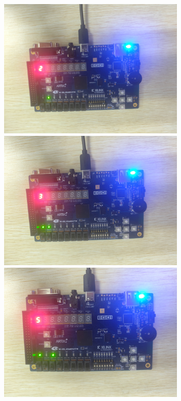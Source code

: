 \documentclass[a4,10pt,zihao=-4]{ctexart}
\begin{document}
\begin{figure}[!h]
	\centering
	\begin{minipage}{0.49\linewidth}
		\centering
		\includegraphics[width=0.8\textwidth]{板载结果2.jpg}
	\end{minipage}
	\begin{minipage}{0.49\linewidth}
		\centering
		\includegraphics[width=0.8\textwidth]{板载结果3.jpg}
	\end{minipage}
	\begin{minipage}{0.49\linewidth}
		\centering
		\includegraphics[width=0.8\textwidth]{板载结果5.jpg}


\end{minipage}
\end{figure}
\end{document}
